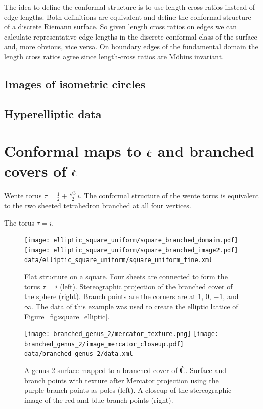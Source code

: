 \documentclass[Thesis.tex]{subfiles}
\begin{document}
The idea to define the conformal structure is to use length cross-ratios instead of edge lengths. Both definitions are equivalent and define the conformal structure of a discrete Riemann surface. So given length cross ratios on edges we can calculate representative edge lengths in the discrete conformal class of the surface and, more obvious, vice versa. On boundary edges of the fundamental domain the length cross ratios agree since length-cross ratios are M{\" o}bius invariant.




\subsection{Images of isometric circles}
\subsection{Hyperelliptic data}

\section{Conformal maps to $\hat{\mathbb C}$ and branched covers of $\hat{\mathbb C}$}

\begin{example}
\label{ex:wente_branched}
Wente torus $\tau=\frac{1}{2}+\frac{\sqrt 3}{2}i$. The conformal structure of the wente torus is equivalent to the two sheeted tetrahedron branched at all four vertices.
\end{example}

\begin{example}
\label{ex:square_branched}
The torus $\tau=i$.
\end{example}

\begin{figure}
\centering
\texttt{[image: elliptic\_square\_uniform/square\_branched\_domain.pdf]}
\texttt{[image: elliptic\_square\_uniform/square\_branched\_image2.pdf]}
{\scriptsize\tt data/elliptic\_square\_uniform/square\_uniform\_fine.xml}
\caption{Flat structure on a square. Four sheets are connected to form the torus $\tau=i$ (left).
Stereographic projection of the branched cover of the sphere (right). Branch points are the corners are at $1$, $0$, $-1$, and $\infty$. The data of this example was used to create the elliptic lattice of
Figure~\ref{fig:square_elliptic}.}
\label{fig:square_branched}
\end{figure}

\begin{figure}
\centering
\texttt{[image: branched\_genus\_2/mercator\_texture.png]}
\texttt{[image: branched\_genus\_2/image\_mercator\_closeup.pdf]}
{\scriptsize\tt data/branched\_genus\_2/data.xml}
\caption{A genus $2$ surface mapped to a branched cover of $\hat{\mathbb C}$.  Surface and branch points with texture after Mercator projection using the purple branch points as poles (left). A closeup of the stereographic image of the red and blue branch points (right).}
\label{fig:genus2_branched}
\end{figure}
\end{document}
